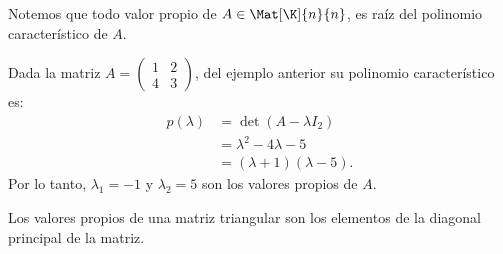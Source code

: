 \documentclass[compacto,10pt]{pubciencias-notas}
\begin{document}
\begin{advertencia}
Notemos que todo valor propio de $A\in\Mat[\K]{n}{n}$, es raíz del polinomio característico de $A$.
\end{advertencia}

\begin{ejem}\hspace{0pt} Dada la matriz $A = \begin{pmatrix} 1&2\\4&3 \end{pmatrix}$, del ejemplo anterior su polinomio característico es:
\begin{align*}
    p(\lambda)  &=  \det(A - \lambda I_{2})\\
                &= \lambda^2 - 4\lambda - 5\\
                &= (\lambda + 1) (\lambda - 5).
\end{align*}
Por lo tanto, $\lambda_1 = -1$ y $\lambda_2 = 5$ son los valores propios de $A$.
\end{ejem}

\begin{prop}
Los valores propios de una matriz triangular son los elementos de la diagonal principal de la matriz. 
\end{prop}
%

\end{document}
